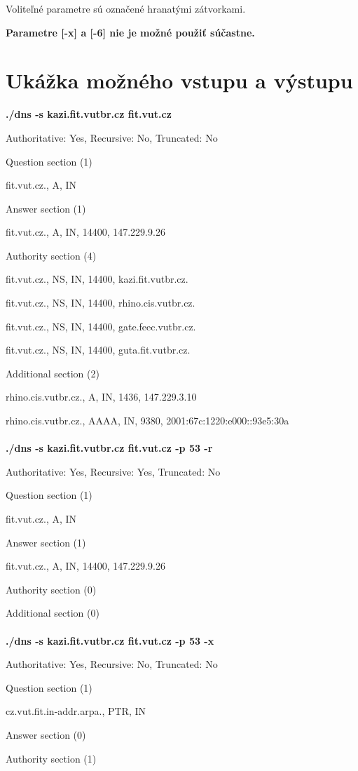 \documentclass[a4paper,11pt]{article}
\begin{document}
Voliteľné parametre sú označené hranatými zátvorkami.
    
    \textbf{Parametre [-x] a [-6] nie je možné použiť súčastne.}


\section{Ukážka možného vstupu a výstupu}
\textbf{./dns -s kazi.fit.vutbr.cz fit.vut.cz}

Authoritative: Yes, Recursive: No, Truncated: No

Question section (1)

 fit.vut.cz., A, IN

Answer section (1)

 fit.vut.cz., A, IN, 14400, 147.229.9.26

Authority section (4)

 fit.vut.cz., NS, IN, 14400, kazi.fit.vutbr.cz.

 fit.vut.cz., NS, IN, 14400, rhino.cis.vutbr.cz.

 fit.vut.cz., NS, IN, 14400, gate.feec.vutbr.cz.

 fit.vut.cz., NS, IN, 14400, guta.fit.vutbr.cz.

Additional section (2)

 rhino.cis.vutbr.cz., A, IN, 1436, 147.229.3.10

 rhino.cis.vutbr.cz., AAAA, IN, 9380, 2001:67c:1220:e000::93e5:30a\\
\\
\textbf{./dns -s kazi.fit.vutbr.cz fit.vut.cz -p 53 -r}

Authoritative: Yes, Recursive: Yes, Truncated: No

Question section (1)

 fit.vut.cz., A, IN

Answer section (1)

 fit.vut.cz., A, IN, 14400, 147.229.9.26

Authority section (0)

Additional section (0)\\
\\
\textbf{./dns -s kazi.fit.vutbr.cz fit.vut.cz -p 53 -x}

Authoritative: Yes, Recursive: No, Truncated: No

Question section (1)

 cz.vut.fit.in-addr.arpa., PTR, IN

Answer section (0)

Authority section (1)
\end{document}
